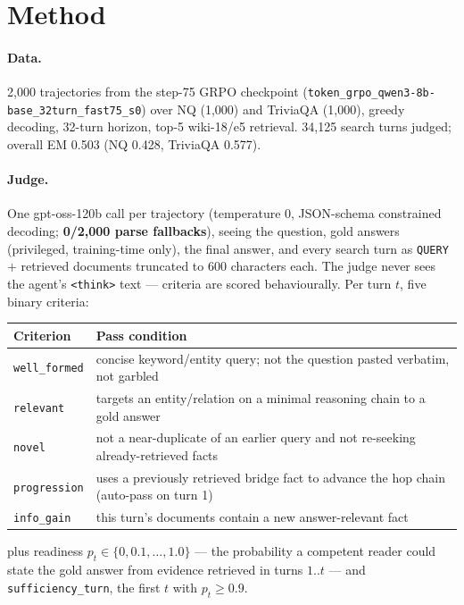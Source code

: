 \documentclass[10pt]{article}
\newcommand{\code}[1]{\texttt{\small #1}}
\begin{document}
\section{Method}
\paragraph{Data.} 2{,}000 trajectories from the step-75 GRPO checkpoint
(\code{token\_grpo\_qwen3-8b-base\_32turn\_fast75\_s0}) over NQ (1{,}000) and TriviaQA
(1{,}000), greedy decoding, 32-turn horizon, top-5 wiki-18/e5 retrieval. 34{,}125 search turns
judged; overall EM 0.503 (NQ 0.428, TriviaQA 0.577).

\paragraph{Judge.} One gpt-oss-120b call per trajectory (temperature 0, JSON-schema constrained
decoding; \textbf{0/2{,}000 parse fallbacks}), seeing the question, gold answers (privileged,
training-time only), the final answer, and every search turn as \code{QUERY} + retrieved
documents truncated to 600 characters each. The judge never sees the agent's
\code{<think>} text --- criteria are scored behaviourally. Per turn $t$, five binary criteria:

\begin{center}\small
\begin{tabular}{p{2.4cm}p{13.6cm}}
\toprule
\textbf{Criterion} & \textbf{Pass condition}\\
\midrule
\code{well\_formed} & concise keyword/entity query; not the question pasted verbatim, not garbled\\
\code{relevant} & targets an entity/relation on a minimal reasoning chain to a gold answer\\
\code{novel} & not a near-duplicate of an earlier query and not re-seeking already-retrieved facts\\
\code{progression} & uses a previously retrieved bridge fact to advance the hop chain (auto-pass on turn 1)\\
\code{info\_gain} & this turn's documents contain a new answer-relevant fact\\
\bottomrule
\end{tabular}
\end{center}

\noindent plus readiness $p_t \in \{0, 0.1, \dots, 1.0\}$ --- the probability a competent
reader could state the gold answer from evidence retrieved in turns $1..t$ --- and
\code{sufficiency\_turn}, the first $t$ with $p_t \geq 0.9$.
\end{document}
